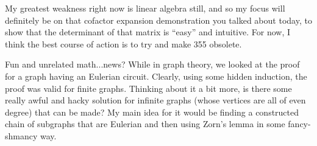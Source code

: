 \documentclass[12pt]{article}
\begin{document}
My greatest weakness right now is linear algebra still, and so my focus will definitely be on that cofactor
expansion demonstration you talked about today, to show that the determinant of that matrix
is ``easy'' and intuitive. For now, I think the best course of action is to try and make 355 obsolete.


\vspace{1em}
Fun and unrelated math...news? While in graph theory, we looked at the proof for a graph having an Eulerian circuit.
Clearly, using some hidden induction, the proof was valid for finite graphs. Thinking about it a bit more, is there some
really awful and hacky solution for infinite graphs (whose vertices are all of even degree) that can be made?
My main idea for it would be finding a constructed chain of subgraphs that are Eulerian and then using Zorn's lemma in some
fancy-shmancy way.
\end{document}
